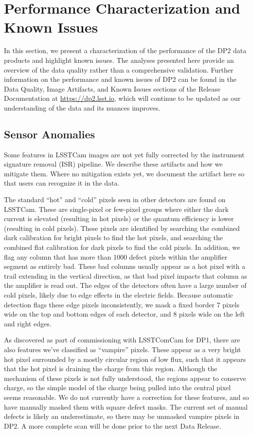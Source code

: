 \section{Performance Characterization and Known Issues}
\label{sec:performance}

In this section, we present a characterization of the performance of the \gls{DP2} data products and highlight known issues.
The analyses presented here provide an overview of the data quality rather than a comprehensive validation.
Further information on the performance and known issues of \gls{DP2} can be found in the Data Quality, Image Artifacts, and Known Issues sections of the Release Documentation at \url{https://dp2.lsst.io}, which will continue to be updated as our understanding of the data and its nuances improves.

\subsection{Sensor Anomalies}

Some features in \gls{LSSTCam} images are not yet fully corrected by the instrument signature removal (ISR) pipeline.
We describe these artifacts and how we mitigate them.
Where no mitigation exists yet, we document the artifact here so that users can recognize it in the data.

The standard ``hot'' and ``cold'' pixels seen in other detectors are found on \gls{LSSTCam}.
These are single-pixel or few-pixel groups where either the dark current is elevated (resulting in hot pixels) or the quantum efficiency is lower (resulting in cold pixels).
These pixels are identified by searching the combined dark \gls{calibration} for bright pixels to find the hot pixels, and searching the combined flat \gls{calibration} for dark pixels to find the cold pixels.
In addition, we flag any column that has more than 1000 defect pixels within the amplifier segment as entirely bad.
These bad columns usually appear as a hot pixel with a trail extending in the vertical direction, as that bad pixel impacts that column as the amplifier is read out.
The edges of the detectors often have a large number of cold pixels, likely due to edge effects in the electric fields.
Because automatic detection flags these edge pixels inconsistently, we mask a fixed border 7 pixels wide on the top and bottom edges of each detector, and 8 pixels wide on the left and right edges.

As discovered as part of commissioning with \gls{LSSTComCam} for \gls{DP1}, there are also features we've classified as ``vampire'' pixels.
These appear as a very bright hot pixel surrounded by a mostly circular region of low \gls{flux}, such that it appears that the hot pixel is draining the charge from this region.
Although the mechanism of these pixels is not fully understood, the regions appear to conserve charge, so the simple model of the charge being pulled into the central pixel seems reasonable.
We do not currently have a correction for these features, and so have manually masked them with square defect masks.
The current set of manual defects is likely an underestimate, so there may be unmasked vampire pixels in \gls{DP2}.
A more complete scan will be done prior to the next \gls{Data Release}.

